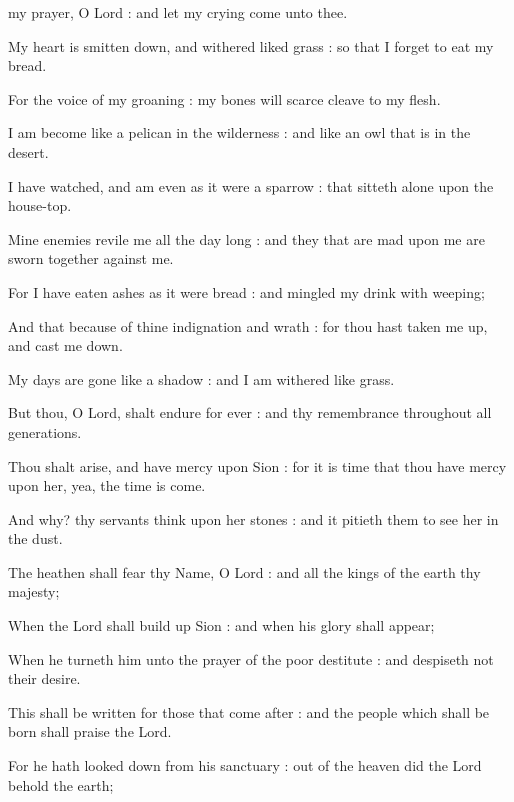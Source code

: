  my prayer, O Lord : and let my crying come unto thee.\par
{}
My heart is smitten down, and withered liked grass : so that I forget to eat my bread.\par
{}For the voice of my groaning : my bones will scarce cleave to my flesh.\par
{}I am become like a pelican in the wilderness : and like an owl that is in the desert.\par
{}I have watched, and am even as it were a sparrow : that sitteth alone upon the house-top.\par
{}Mine enemies revile me all the day long : and they that are mad upon me are sworn together against me.\par
{}For I have eaten ashes as it were bread : and mingled my drink with weeping;\par
{}And that because of thine indignation and wrath : for thou hast taken me up, and cast me down.\par
{}My days are gone like a shadow : and I am withered like grass.\par
{}But thou, O Lord, shalt endure for ever : and thy remembrance throughout all generations.\par
{}Thou shalt arise, and have mercy upon Sion : for it is time that thou have mercy upon her, yea, the time is come.\par
{}And why? thy servants think upon her stones : and it pitieth them to see her in the dust.\par
{}The heathen shall fear thy Name, O Lord : and all the kings of the earth thy majesty;\par
{}When the Lord shall build up Sion : and when his glory shall appear;\par
{}When he turneth him unto the prayer of the poor destitute : and despiseth not their desire.\par
{}This shall be written for those that come after : and the people which shall be born shall praise the Lord.\par
{}For he hath looked down from his sanctuary : out of the heaven did the Lord behold the earth;\par
